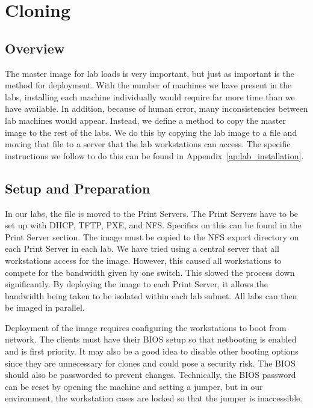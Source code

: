 \section{Cloning} \label{sec:cloning}
\subsection{Overview}
The master image for lab loads is very important, but just as important is the method for deployment.  With the number of machines we have present in the labs, installing each machine individually would require far more time than we have available.  In addition, because of human error, many inconsistencies between lab machines would appear.  Instead, we define a method to copy the master image to the rest of the labs.  We do this by copying the lab image to a file and moving that file to a server that the lab workstations can access.  The specific instructions we follow to do this can be found in Appendix~\ref{ap:lab_installation}.

\subsection{Setup and Preparation}
In our labs, the file is moved to the Print Servers.  The Print Servers have to be set up with DHCP, TFTP, PXE, and NFS.  Specifics on this can be found in the Print Server section.  The image must be copied to the NFS export directory on each Print Server in each lab.  We have tried using a central server that all workstations access for the image.  However, this caused all workstations to compete for the bandwidth given by one switch.  This slowed the process down significantly.  By deploying the image to each Print Server, it allows the bandwidth being taken to be isolated within each lab subnet.  All labs can then be imaged in parallel.  

Deployment of the image requires configuring the workstations to boot from network.  The clients must have their BIOS setup so that netbooting is enabled and is first priority.  It may also be a good idea to disable other booting options since they are unnecessary for clones and could pose a security risk.  The BIOS should also be passworded to prevent changes.  Technically, the BIOS password can be reset by opening the machine and setting a jumper, but in our environment, the workstation cases are locked so that the jumper is inaccessible.  

